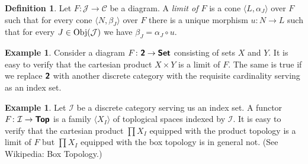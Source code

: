 \documentclass[12pt]{article}
\theoremstyle{definition}
\newtheorem{dfn}[thm]{Definition}
\newtheorem{exm}[thm]{Example}
\theoremstyle{remark}
\newcommand{\catvar}[1]{\mathcal{#1}}
\newcommand{\CC}{\catvar{C}}
\newcommand{\II}{\catvar{I}}
\newcommand{\JJ}{\catvar{J}}
\newcommand{\catname}[1]{\textup{\sffamily\textbf{#1}}}
\newcommand*{\Set}{\catname{Set}}
\newcommand*{\Top}{\catname{Top}}
\newcommand{\Obj}[1]{\textup{Obj}(#1)}
\begin{document}
    \begin{dfn}
        Let $F\colon\JJ\to\CC$ be a diagram. A \emph{limit of $F$} is a cone $\langle L,\alpha_J\rangle$ over $F$ such that for every cone $\langle N,\beta_J\rangle$ over $F$ there is a unique morphism $u\colon N\to L$ such that for every $J\in\Obj{\JJ}$ we have $\beta_J=\alpha_J\circ u$.
    \end{dfn}

    \begin{exm}
        Consider a diagram $F\colon\catname{2}\to\Set$ consisting of sets $X$ and $Y$. It is easy to verify that the cartesian product $X\times Y$ is a limit of $F$. The same is true if we replace $\catname{2}$ with another discrete category with the requisite cardinality serving as an index set.
    \end{exm}

    \begin{exm}
        Let $\II$ be a discrete category serving us an index set. A functor $F\colon\II\to\Top$ is a family $\langle X_I\rangle$ of toplogical spaces indexed by $\II$. It is easy to verify that the cartesian product $\prod X_I$ equipped with the product topology is a limit of $F$ but $\prod X_I$ equipped with the box topology is in general not. (See Wikipedia: Box Topology.)
    \end{exm}
\end{document}
